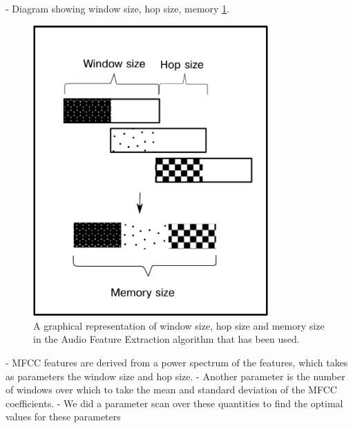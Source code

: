 \documentclass[12pt,oneside]{book}
\begin{document}
%
%



- Diagram showing window size, hop size, memory \ref{fig:dm_ws_hs_mem}.

\begin{figure}[h]
\centering
\includegraphics[width=90mm]{figures/dm_ws_hs_mem.png}
\caption{A graphical representation of window size, hop size and
  memory size in the Audio Feature Extraction algorithm that has been
  used.}
\label{fig:dm_ws_hs_mem}
\end{figure}

%
%

- MFCC features are derived from a power spectrum of the features,
which takes as parameters the window size and hop size.
- Another parameter is the number of windows over which to take the
mean and standard deviation of the MFCC coefficients.
- We did a parameter scan over these quantities to find the optimal
values for these parameters
\end{document}
